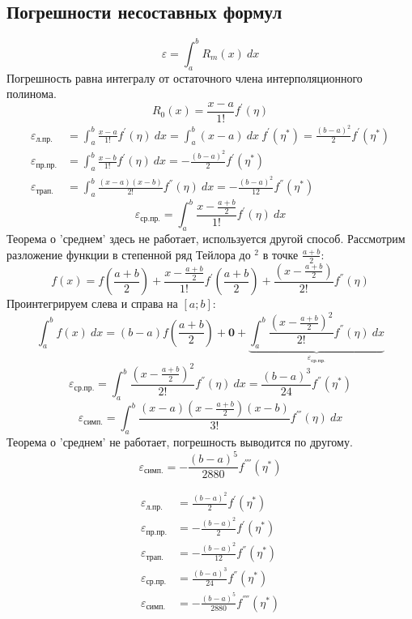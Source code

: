 \documentclass[a4paper,11pt]{article}
\begin{document}
  \subsection{Погрешности несоставных формул}
  \[\varepsilon = \int_a^b R_m(x)\ dx\]
  Погрешность равна интегралу от остаточного члена интерполяционного полинома.
  \[R_0(x) = \frac{x-a}{1!}f^{'}(\eta)\]
  \begin{align*}
    \varepsilon_{\text{л.пр.}}  &= \int_a^b \frac{x-a}{1!} f^{'}(\eta)\ dx = \int_a^b (x-a)\ dx\ f^{'}(\eta^*) = \frac{(b-a)^2}{2}f^{'}(\eta^*) \\
    \varepsilon_{\text{пр.пр.}} &= \int_a^b \frac{x-b}{1!} f^{'}(\eta)\ dx = - \frac{(b-a)^2}{2}f^{'}(\eta^*) \\
    \varepsilon_{\text{трап.}}  &= \int_a^b \frac{(x-a)(x-b)}{2!} f^{''}(\eta)\ dx = - \frac{(b-a)^2}{12}f^{''}(\eta^*)
  \end{align*}
  \[\varepsilon_{\text{ср.пр.}} = \int_a^b \frac{x-\frac{a+b}{2}}{1!} f^{'}(\eta)\ dx\]
  Теорема о 'среднем' здесь не работает, используется другой способ.
  Рассмотрим разложение функции в степенной ряд Тейлора до $^2$  в точке $\frac{a+b}{2}$:
  \[f(x) = f(\frac{a+b}{2}) + \frac{x-\frac{a+b}{2}}{1!} f^{'}(\frac{a+b}{2}) + \frac{(x-\frac{a+b}{2})}{2!} f^{''}(\eta)\]
  Проинтегрируем слева и справа на $[a; b]$:
  \[\int_a^b f(x)\ dx = (b-a)f(\frac{a+b}{2}) + \textbf{0} + \underbrace{\int_a^b \frac{(x-\frac{a+b}{2})^2}{2!} f^{''}(\eta)\ dx}_{\varepsilon_{\text{ср.пр.}}}\]
  \[\varepsilon_{\text{ср.пр.}} = \int_a^b \frac{(x-\frac{a+b}{2})^2}{2!} f^{''}(\eta)\ dx = \frac{(b-a)^3}{24}f^{''}(\eta^*)\]
  \[\varepsilon_{\text{симп.}} = \int_a^b \frac{(x-a)(x-\frac{a+b}{2})(x-b)}{3!} f^{'''}(\eta)\ dx\]
  Теорема о 'среднем' не работает, погрешность выводится по другому.
  \[\varepsilon_{\text{симп.}} = - \frac{(b-a)^5}{2880} f^{''''}(\eta^*)\]
  \begin{importantblock}
    \begin{align*}
      \varepsilon_{\text{л.пр.}}  &= \frac{(b-a)^2}{2}f^{'}(\eta^*) \\
      \varepsilon_{\text{пр.пр.}} &= - \frac{(b-a)^2}{2}f^{'}(\eta^*) \\
      \varepsilon_{\text{трап.}}  &= - \frac{(b-a)^2}{12}f^{''}(\eta^*) \\
      \varepsilon_{\text{ср.пр.}} &= \frac{(b-a)^3}{24}f^{''}(\eta^*) \\
      \varepsilon_{\text{симп.}}  &= - \frac{(b-a)^5}{2880} f^{''''}(\eta^*)
    \end{align*}
  \end{importantblock}
  
\end{document}
